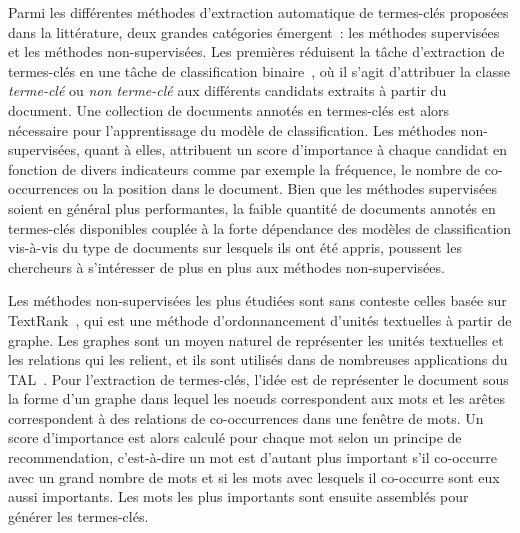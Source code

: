  Parmi les différentes méthodes d'extraction automatique de termes-clés proposées dans la littérature, deux grandes catégories émergent~: les méthodes supervisées et les méthodes non-supervisées.
  Les premières réduisent la tâche d'extraction de termes-clés en une tâche de classification binaire~\cite{witten1999kea}, où il s'agit d'attribuer la classe \og{}\textit{terme-clé}\fg{} ou \og{}\textit{non terme-clé}\fg{} aux différents candidats extraits à partir du document.
  Une collection de documents annotés en termes-clés est alors nécessaire pour l'apprentissage du modèle de classification.
  Les méthodes non-supervisées, quant à elles, attribuent un score d'importance à chaque candidat en fonction de divers indicateurs comme par exemple la fréquence, le nombre de co-occurrences ou la position dans le document.
  Bien que les méthodes supervisées soient en général plus performantes, la faible quantité de documents annotés en termes-clés disponibles couplée à la forte dépendance des modèles de classification vis-à-vis du type de documents sur lesquels ils ont été appris, poussent les chercheurs à s'intéresser de plus en plus aux méthodes non-supervisées.

  Les méthodes non-supervisées les plus étudiées sont sans conteste celles basée sur TextRank~\cite{mihalcea2004textrank}, qui est une méthode d'ordonnancement d'unités textuelles à partir de graphe.
  Les graphes sont un moyen naturel de représenter les unités textuelles et les relations qui les relient, et ils sont utilisés dans de nombreuses applications du TAL~\cite{kozareva2013textgraphs}.
  Pour l'extraction de termes-clés, l'idée est de représenter le document sous la forme d'un graphe dans lequel les noeuds correspondent aux mots et les arêtes correspondent à des relations de co-occurrences dans une fenêtre de mots.
  Un score d'importance est alors calculé pour chaque mot selon un principe de recommendation, c'est-à-dire un mot est d'autant plus important s'il co-occurre avec un grand nombre de mots et si les mots avec lesquels il co-occurre sont eux aussi importants.
  Les mots les plus importants sont ensuite assemblés pour générer les termes-clés.

